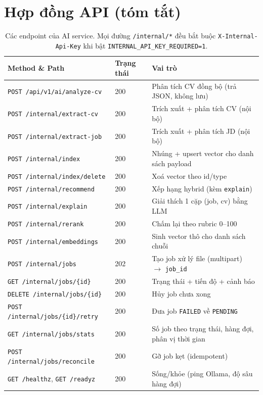 \documentclass[a4paper,11pt]{article}
\begin{document}
\section{Hợp đồng API (tóm tắt)}

\begin{table}[htbp]
\centering\small
\begin{tabular}{@{}llp{8.6cm}@{}}
\toprule
\textbf{Method \& Path} & \textbf{Trạng thái} & \textbf{Vai trò} \\
\midrule
\texttt{POST /api/v1/ai/analyze-cv} & 200 & Phân tích CV đồng bộ (trả JSON, không lưu) \\
\texttt{POST /internal/extract-cv}  & 200 & Trích xuất + phân tích CV (nội bộ) \\
\texttt{POST /internal/extract-job} & 200 & Trích xuất + phân tích JD (nội bộ) \\
\texttt{POST /internal/index}       & 200 & Nhúng + upsert vector cho danh sách payload \\
\texttt{POST /internal/index/delete}& 200 & Xoá vector theo id/type \\
\texttt{POST /internal/recommend}   & 200 & Xếp hạng hybrid (kèm \texttt{explain}) \\
\texttt{POST /internal/explain}     & 200 & Giải thích 1 cặp (job, cv) bằng LLM \\
\texttt{POST /internal/rerank}      & 200 & Chấm lại theo rubric 0--100 \\
\texttt{POST /internal/embeddings}  & 200 & Sinh vector thô cho danh sách chuỗi \\
\midrule
\texttt{POST /internal/jobs}        & 202 & Tạo job xử lý file (multipart) $\to$ \texttt{job\_id} \\
\texttt{GET  /internal/jobs/\{id\}}  & 200 & Trạng thái + tiến độ + cảnh báo \\
\texttt{DELETE /internal/jobs/\{id\}}& 200 & Hủy job chưa xong \\
\texttt{POST /internal/jobs/\{id\}/retry} & 200 & Đưa job \texttt{FAILED} về \texttt{PENDING} \\
\texttt{GET  /internal/jobs/stats}  & 200 & Số job theo trạng thái, hàng đợi, phân vị thời gian \\
\texttt{POST /internal/jobs/reconcile} & 200 & Gỡ job kẹt (idempotent) \\
\midrule
\texttt{GET /healthz}, \texttt{GET /readyz} & 200 & Sống/khỏe (ping Ollama, độ sâu hàng đợi) \\
\bottomrule
\end{tabular}
\caption{Các endpoint của AI service. Mọi đường \texttt{/internal/*} đều bắt buộc
\texttt{X-Internal-Api-Key} khi bật \texttt{INTERNAL\_API\_KEY\_REQUIRED=1}.}
\label{tab:api}
\end{table}
\end{document}
